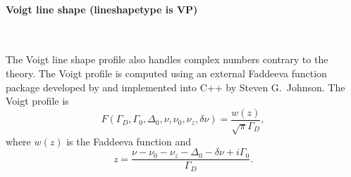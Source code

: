 \paragraph*{Voigt line shape (lineshapetype is VP)} \

The Voigt line shape profile also handles complex numbers contrary to the 
theory.  The Voigt profile is computed using an external Faddeeva function
package developed by \citet{zaghloul12:_algorithm916_acm} and implemented into
C++ by Steven G.\ Johnson.  The Voigt profile is
\begin{equation}
 F(\Gamma_D, \Gamma_0, \Delta_0, \nu, \nu_0, \nu_z, \delta\nu) = \frac{w(z)}{\sqrt{\pi}\Gamma_D},
\end{equation}
where $w(z)$ is the Faddeeva function and
\begin{equation}
 z = \frac{\nu-\nu_0-\nu_z-\Delta_0-\delta\nu + i\Gamma_0}{\Gamma_D}.
\end{equation}

